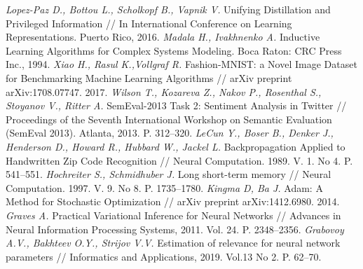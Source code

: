 \documentclass[12pt]{a&t}
\begin{document}
\begin{thebibliography}{10}
	\textit{Lopez-Paz D., Bottou L., Scholkopf B., Vapnik V.} Unifying Distillation and Privileged Information // In International Conference on Learning Representations. Puerto Rico, 2016.
	\textit{Madala H., Ivakhnenko A.} Inductive Learning Algorithms for Complex Systems Modeling. Boca Raton: CRC Press Inc., 1994.
	\textit{Xiao H., Rasul K.,Vollgraf R.} Fashion-MNIST: a Novel Image Dataset for Benchmarking Machine Learning Algorithms // arXiv preprint arXiv:1708.07747. 2017.
	\textit{Wilson T., Kozareva Z., Nakov P., Rosenthal S., Stoyanov V., Ritter A.} {S}em{E}val-2013 Task 2: Sentiment Analysis in Twitter // Proceedings of the Seventh International Workshop on Semantic Evaluation ({S}em{E}val 2013). Atlanta, 2013. P. 312--320.
	\textit{LeCun Y., Boser B., Denker J., Henderson D., Howard R., Hubbard W., Jackel L.} Backpropagation Applied to Handwritten Zip Code Recognition // Neural Computation. 1989. V. 1. No 4. P. 541--551.
	\textit{Hochreiter S., Schmidhuber J.} Long short-term memory // Neural Computation. 1997. V. 9. No 8.  P. 1735--1780.
	\textit{Kingma D, Ba J.} Adam: A Method for Stochastic Optimization // arXiv preprint arXiv:1412.6980. 2014.
	\textit{Graves A.} Practical Variational Inference for Neural Networks // Advances in Neural Information Processing Systems, 2011. Vol. 24. P. 2348--2356.
	\textit{Grabovoy A.V., Bakhteev O.Y., Strijov V.V.} Estimation of relevance for neural network parameters // Informatics and Applications, 2019. Vol.13 No 2. P. 62--70.
 \end{thebibliography}
\end{document}
